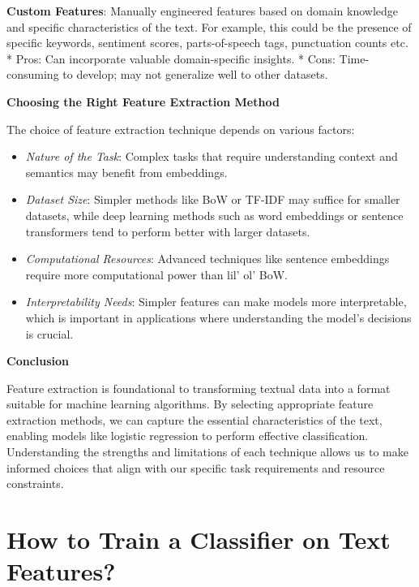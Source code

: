 \documentclass[
  letterpaper,
  DIV=11,
  numbers=noendperiod]{scrreprt}
\providecommand{\tightlist}{%
  \setlength{\itemsep}{0pt}\setlength{\parskip}{0pt}}\usepackage{longtable,booktabs,array}
\begin{document}
\begin{tcolorbox}
\textbf{Custom Features}: Manually engineered features based on domain
knowledge and specific characteristics of the text. For example, this
could be the presence of specific keywords, sentiment scores,
parts-of-speech tags, punctuation counts etc. * Pros: Can incorporate
valuable domain-specific insights. * Cons: Time-consuming to develop;
may not generalize well to other datasets.

\textbf{Choosing the Right Feature Extraction Method}

The choice of feature extraction technique depends on various factors:

\begin{itemize}
\tightlist
\item
  \emph{Nature of the Task}: Complex tasks that require understanding
  context and semantics may benefit from embeddings.
\item
  \emph{Dataset Size}: Simpler methods like BoW or TF-IDF may suffice
  for smaller datasets, while deep learning methods such as word
  embeddings or sentence transformers tend to perform better with larger
  datasets.
\item
  \emph{Computational Resources}: Advanced techniques like sentence
  embeddings require more computational power than lil' ol' BoW.
\item
  \emph{Interpretability Needs}: Simpler features can make models more
  interpretable, which is important in applications where understanding
  the model's decisions is crucial.
\end{itemize}

\textbf{Conclusion}

Feature extraction is foundational to transforming textual data into a
format suitable for machine learning algorithms. By selecting
appropriate feature extraction methods, we can capture the essential
characteristics of the text, enabling models like logistic regression to
perform effective classification. Understanding the strengths and
limitations of each technique allows us to make informed choices that
align with our specific task requirements and resource constraints.

\end{tcolorbox}

\section{How to Train a Classifier on Text
Features?}\label{how-to-train-a-classifier-on-text-features}
\end{document}

